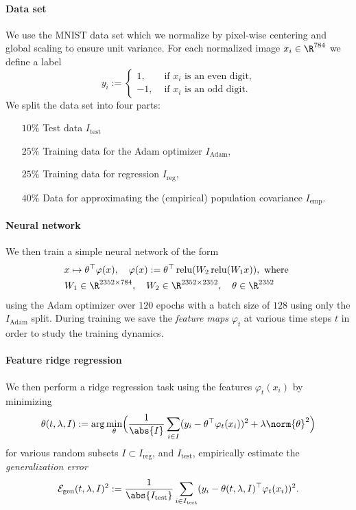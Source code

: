 \paragraph{Data set}
We use the MNIST data set which we normalize by pixel-wise centering and global scaling to ensure unit variance. For each normalized image $x_i\in\R^{784}$ we define a label
\[y_i := \begin{cases} 1,&  \text{ if }x_i\text{ is an even digit,}  \\ -1,& \text{ if }x_i\text{ is an odd digit.}\end{cases}
\]
We split the data set into four parts:
\begin{itemize}
\item[$10\%$] Test data $I_\mathrm{test}$ 
\item[$25\%$] Training data for the Adam optimizer $I_\mathrm{Adam}$,
\item[$25\%$] Training data for regression $I_\mathrm{reg}$,
\item[$40\%$] Data for approximating the (empirical) population covariance $I_\mathrm{emp}$.
\end{itemize}


\paragraph{Neural network}
We then train a simple neural network of the form 
\begin{equation}
    \begin{aligned}
    &x\mapsto \theta^\top\varphi(x), \quad \varphi(x):=\theta^\top\operatorname{relu}(W_2 \operatorname{relu}( W_1 x)), \text{ where } \\
    &W_1\in\R^{2352\times 784},\quad W_2\in\R^{2352\times 2352}, \quad \theta\in\R^{2352}
    \end{aligned}
\end{equation}
using the Adam optimizer over $120$ epochs with a batch size of $128$ using only the $I_\mathrm{Adam}$ split. During training we save the \emph{feature maps} $\varphi_t$ at various time steps $t$ in order to study the training dynamics. 

\paragraph{Feature ridge regression} We then perform a ridge regression task using the features $\varphi_t(x_i)$ by minimizing
\begin{equation}
    \theta(t,\lambda,I):=\arg\min_\theta \Bigl(\frac{1}{\abs{I}}\sum_{i\in I} (y_i- \theta^\top\varphi_t(x_i))^2 + \lambda \norm{\theta}^2\Bigr)
\end{equation}
for various random subsets $I\subset I_\mathrm{reg}$, and $I_\mathrm{test}$, empirically estimate the \emph{generalization error} 
\begin{equation}
    \mathcal E_\mathrm{gen}(t,\lambda,I)^2 := \frac{1}{\abs{I_\mathrm{test}}} \sum_{i\in I_\mathrm{test}} (y_i - \theta(t,\lambda,I)^\top\varphi_t(x_i))^2.
\end{equation}

